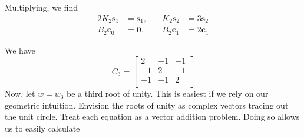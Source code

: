 \documentclass[a4paper]{article}
\begin{document}
Multiplying, we find
\begin{alignat*}{2}
	K_{2}\pmb{s}_{1} & = \pmb{s}_{1}, & \quad K_{2}\pmb{s}_{2} & = 3\pmb{s}_{2} \\
	B_{2}\pmb{c}_{0} & = \pmb{0}, & \quad B_{2}\pmb{c}_{1} & = 2 \pmb{c}_{1} 
\end{alignat*}


We have
\[
	C_{3} = \begin{bmatrix}
		2 & -1 & -1 \\
		-1 & 2 & -1 \\
		-1 & -1 & 2 \\
	\end{bmatrix} 
\]
Now, let \( w = w_{3} \) be a third root of unity. This is easiest if we rely on our geometric intuition. Envision the roots of unity as complex vectors tracing out the unit circle. Treat each equation as a vector addition problem. Doing so allows us to easily calculate
\end{document}

